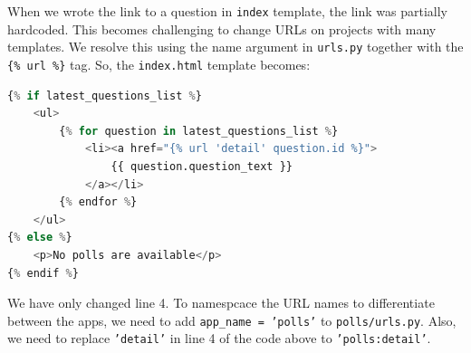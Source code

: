 \documentclass[a4paper, openany]{memoir}
\begin{document}
    When we wrote the link to a question in \texttt{index} template, the link was partially hardcoded. This becomes challenging to change URLs on projects with many templates. We resolve this using the name argument in \texttt{urls.py} together with the \texttt{\{\% url \%\}} tag. So, the \texttt{index.html} template becomes:
\begin{lstlisting}[language=python]
{% if latest_questions_list %}
    <ul>
        {% for question in latest_questions_list %}
            <li><a href="{% url 'detail' question.id %}">
                {{ question.question_text }}
            </a></li>
        {% endfor %}
    </ul>
{% else %}
    <p>No polls are available</p>
{% endif %}
\end{lstlisting}
    We have only changed line 4. To namespcace the URL names to differentiate between the apps, we need to add \texttt{app\_name = 'polls'} to \texttt{polls/urls.py}. Also, we need to replace \texttt{'detail'} in line 4 of the code above to \texttt{'polls:detail'}.
    \newpage
\end{document}
